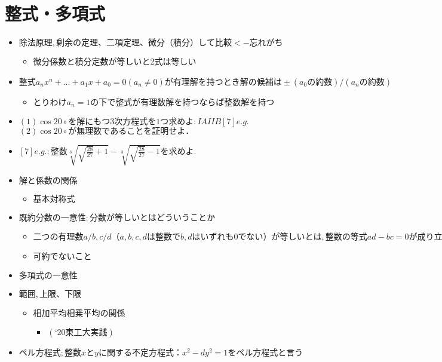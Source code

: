 \documentclass[dvipdfmx,uplatex]{jsarticle}
\begin{document}
\section{整式・多項式}
\begin{itemize}
	\item $ 除法原理,剰余の定理、二項定理、微分（積分）して比較<-忘れがち$
	\begin{itemize}
		\item 微分係数と積分定数が等しいと2式は等しい
	\end{itemize}
	\item $ 整式a_nx^n+...+a_1x+a_0=0(a_n≠0)が有理解を持つとき解の候補は±(a_0の約数)/(a_nの約数)$
	\begin{itemize}
		\item $ とりわけa_n=1の下で整式が有理数解を持つならば整数解を持つ$
	\end{itemize}
	\item 	$ (1)\cos 20 \circ を解にもつ3次方程式を1つ求めよ:IAIIB[7]e.g.$ \\
		$ (2)\cos 20 \circ が無理数であることを証明せよ．$
	\item $ [7]e.g.;整数 \sqrt[3]{ \sqrt{ \frac{28}{27}}+1} - \sqrt[3]{ \sqrt{ \frac{28}{27}}-1}を求めよ.$
	\item $ 解と係数の関係$
	\begin{itemize}
		\item $ 基本対称式$
	\end{itemize}
	\item $ 既約分数の一意性:分数が等しいとはどういうことか$
	\begin{itemize}
		\item $ 二つの有理数 a/b, c/d（a, b, c, d は整数で b, d はいずれも 0 でない）が等しいとは,整数の等式ad - bc = 0が成り立つことを言う$
		\item $ 可約でないこと$
	\end{itemize}
	\item $ 多項式の一意性$
	\item $ 範囲,上限、下限$
	\begin{itemize}
		\item $ 相加平均相乗平均の関係$
		\begin{itemize}
			\item $ (‘20東工大実践)$
		\end{itemize}
	\end{itemize}
	\item $ペル方程式;整数 x と y に関する不定方程式：x^2−dy^2=1 をペル方程式と言う$
	\begin{itemize}

\end{itemize}
\end{itemize}
\end{document}
